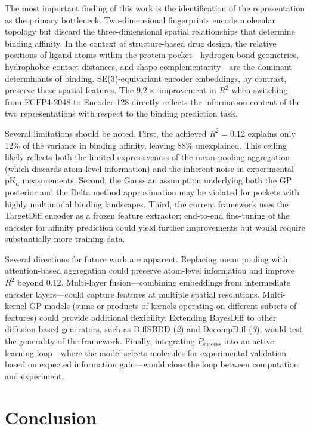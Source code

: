 \documentclass{article}
\newcommand{\Psuccess}{P_{\mathrm{success}}}
\newcommand{\pKd}{\mathrm{pK_d}}
\newcommand{\scite}[1]{(\textit{#1})}
\begin{document}
The most important finding of this work is the identification of the
representation as the primary bottleneck.  Two-dimensional fingerprints
encode molecular topology but discard the three-dimensional spatial
relationships that determine binding affinity.  In the context of
structure-based drug design, the relative positions of ligand atoms
within the protein pocket---hydrogen-bond geometries, hydrophobic contact
distances, and shape complementarity---are the dominant determinants of
binding.  SE(3)-equivariant encoder embeddings, by contrast, preserve
these spatial features.  The $9.2\times$ improvement in $R^{2}$ when
switching from FCFP4-2048 to Encoder-128 directly reflects the
information content of the two representations with respect to the
binding prediction task.

Several limitations should be noted.  First, the achieved $R^{2} = 0.12$
explains only 12\% of the variance in binding affinity, leaving 88\%
unexplained.  This ceiling likely reflects both the limited expressiveness
of the mean-pooling aggregation (which discards atom-level information)
and the inherent noise in experimental $\pKd$ measurements.  Second, the
Gaussian assumption underlying both the GP posterior and the Delta method
approximation may be violated for pockets with highly multimodal binding
landscapes.  Third, the current framework uses the TargetDiff encoder as
a frozen feature extractor; end-to-end fine-tuning of the encoder for
affinity prediction could yield further improvements but would require
substantially more training data.

Several directions for future work are apparent.  Replacing mean pooling
with attention-based aggregation could preserve atom-level information
and improve $R^{2}$ beyond $0.12$.  Multi-layer fusion---combining
embeddings from intermediate encoder layers---could capture features at
multiple spatial resolutions.  Multi-kernel GP models (sums or products
of kernels operating on different subsets of features) could provide
additional flexibility.  Extending BayesDiff to other diffusion-based
generators, such as DiffSBDD \scite{2} and DecompDiff \scite{3}, would
test the generality of the framework.  Finally, integrating $\Psuccess$
into an active-learning loop---where the model selects molecules for
experimental validation based on expected information gain---would close
the loop between computation and experiment.


\section{Conclusion}
\end{document}
